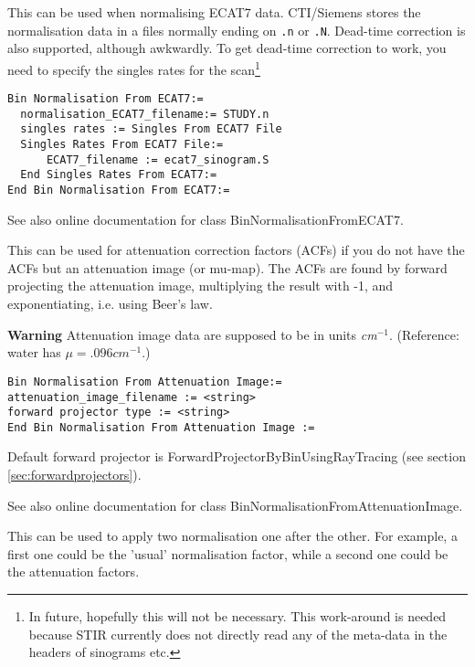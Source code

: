\documentclass{article}
\begin{document}
{ 
}

This can be used when normalising ECAT7 data. CTI/Siemens stores
the normalisation data in a files normally ending on
\texttt{.n} or \texttt{.N}. Dead-time correction is also
supported, although awkwardly. To get dead-time correction
to work, you need to specify the singles rates for the 
scan\footnote{In future, hopefully this will not be necessary.
This work-around is needed because STIR currently does not
directly read any of the meta-data in the headers of sinograms etc.}
{ 
}
\begin{verbatim}
Bin Normalisation From ECAT7:=
  normalisation_ECAT7_filename:= STUDY.n
  singles rates := Singles From ECAT7 File
  Singles Rates From ECAT7 File:=
      ECAT7_filename := ecat7_sinogram.S
  End Singles Rates From ECAT7:=
End Bin Normalisation From ECAT7:=
\end{verbatim}

See also online documentation for class BinNormalisationFromECAT7.

{ 
}
\label{sec:binnormalisationfromattenuationimage}
This can be used for attenuation correction factors (ACFs) if 
you do not have the ACFs but an attenuation image (or mu-map). 
The ACFs are found by forward projecting the attenuation image, 
multiplying the result with -1, and exponentiating, i.e. using 
Beer's law.



\textbf{Warning} Attenuation image data are supposed to be in units \textit{cm}$^{-1}$. 
(Reference: water has $\mu=.096 \mathit{cm}^{-1}$.)

{ 
}
\begin{verbatim}
Bin Normalisation From Attenuation Image:=
attenuation_image_filename := <string>
forward projector type := <string>
End Bin Normalisation From Attenuation Image :=
\end{verbatim}


Default forward projector is ForwardProjectorByBinUsingRayTracing 
(see section \ref{sec:forwardprojectors}).


See also online documentation for class BinNormalisationFromAttenuationImage.

{ 
}
\label{sec:chainedbinnormalisation}
This can be used to apply two normalisation one after the other. 
For example, a first one could be the 'usual' normalisation factor, 
while a second one could be the attenuation factors.
\end{document}
